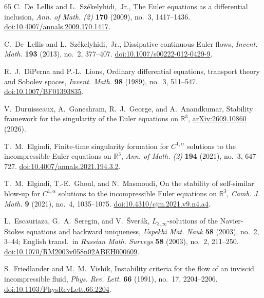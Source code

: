 \documentclass[11pt,reqno]{amsproc}
\numberwithin{equation}{section}
\theoremstyle{remark}
\newcommand{\RR}{\mathbb R}
\begin{document}
\begin{thebibliography}{65}
C.~De~Lellis and L.~Sz\'ekelyhidi,~Jr.,
The Euler equations as a differential inclusion,
\emph{Ann. of Math. (2)} \textbf{170} (2009), no.~3, 1417--1436.
\href{https://doi.org/10.4007/annals.2009.170.1417}{doi:10.4007/annals.2009.170.1417}.

C.~De~Lellis and L.~Sz\'ekelyhidi,~Jr.,
Dissipative continuous Euler flows,
\emph{Invent. Math.} \textbf{193} (2013), no.~2, 377--407.
\href{https://doi.org/10.1007/s00222-012-0429-9}{doi:10.1007/s00222-012-0429-9}.

R.~J.~DiPerna and P.-L.~Lions,
Ordinary differential equations, transport theory and Sobolev spaces,
\emph{Invent. Math.} \textbf{98} (1989), no.~3, 511--547.
\href{https://doi.org/10.1007/BF01393835}{doi:10.1007/BF01393835}.

V.~Duruisseaux, A.~Ganeshram, R.~J.~George, and A.~Anandkumar,
Stability framework for the singularity of the Euler equations on $\RR^3$,
\href{https://arxiv.org/abs/2609.10860}{arXiv:2609.10860} (2026).

T.~M.~Elgindi,
Finite-time singularity formation for $C^{1,\alpha}$ solutions to the incompressible Euler equations on $\RR^3$,
\emph{Ann. of Math. (2)} \textbf{194} (2021), no.~3, 647--727.
\href{https://doi.org/10.4007/annals.2021.194.3.2}{doi:10.4007/annals.2021.194.3.2}.

T.~M.~Elgindi, T.-E.~Ghoul, and N.~Masmoudi,
On the stability of self-similar blow-up for $C^{1,\alpha}$ solutions to the incompressible Euler equations on $\RR^3$,
\emph{Camb. J. Math.} \textbf{9} (2021), no.~4, 1035--1075.
\href{https://doi.org/10.4310/cjm.2021.v9.n4.a4}{doi:10.4310/cjm.2021.v9.n4.a4}.

L.~Escauriaza, G.~A.~Seregin, and V.~\v{S}ver\'ak,
$L_{3,\infty}$-solutions of the Navier-Stokes equations and backward uniqueness,
\emph{Uspekhi Mat. Nauk} \textbf{58} (2003), no.~2, 3--44;
English transl.\ in \emph{Russian Math. Surveys} \textbf{58} (2003), no.~2, 211--250.
\href{https://doi.org/10.1070/RM2003v058n02ABEH000609}{doi:10.1070/RM2003v058n02ABEH000609}.

S.~Friedlander and M.~M.~Vishik,
Instability criteria for the flow of an inviscid incompressible fluid,
\emph{Phys. Rev. Lett.} \textbf{66} (1991), no.~17, 2204--2206.
\href{https://doi.org/10.1103/PhysRevLett.66.2204}{doi:10.1103/PhysRevLett.66.2204}.


\end{thebibliography}
\end{document}
